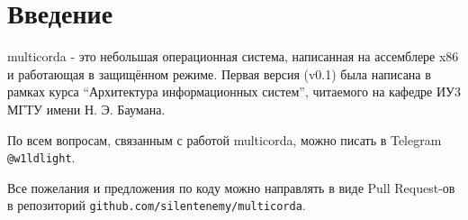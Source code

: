 \chapter{Введение}

multicorda - это небольшая операционная система, написанная на ассемблере x86 и работающая в защищённом режиме. Первая версия (v0.1) была написана в рамках курса ``Архитектура информационных систем'', читаемого на кафедре ИУ3 МГТУ имени Н. Э. Баумана.

По всем вопросам, связанным с работой multicorda, можно писать в Telegram \verb|@w1ldlight|.

Все пожелания и предложения по коду можно направлять в виде Pull Request-ов в репозиторий \verb|github.com/silentenemy/multicorda|.	